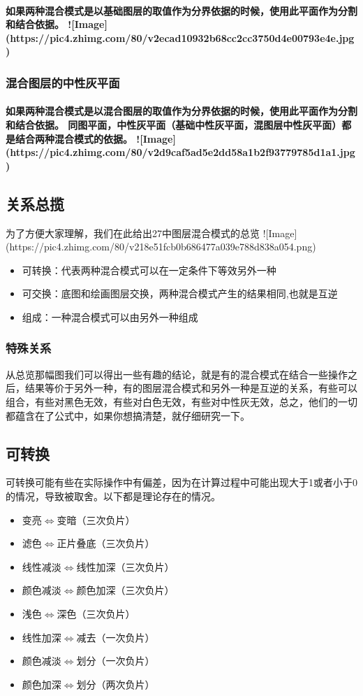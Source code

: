 \paragraph{如果两种混合模式是以基础图层的取值作为分界依据的时候，使用此平面作为分割和结合依据。
	![Image](https://pic4.zhimg.com/80/v2ecad10932b68cc2cc3750d4e00793e4e.jpg)}
\subsubsection{ 混合图层的中性灰平面}
\paragraph{如果两种混合模式是以混合图层的取值作为分界依据的时候，使用此平面作为分割和结合依据。
	同图平面，中性灰平面（基础中性灰平面，混图层中性灰平面）都是结合两种混合模式的依据。
	![Image](https://pic4.zhimg.com/80/v2d9caf5ad5e2dd58a1b2f93779785d1a1.jpg)}
\subsection{ 关系总揽}
为了方便大家理解，我们在此给出27中图层混合模式的总览
![Image](https://pic4.zhimg.com/80/v218e51fcb0b686477a039e788d838a054.png)
\begin{itemize}
	\item 可转换：代表两种混合模式可以在一定条件下等效另外一种
	\item 可交换：底图和绘画图层交换，两种混合模式产生的结果相同,也就是互逆
	\item 组成：一种混合模式可以由另外一种组成
\end{itemize}

\subsubsection{ 特殊关系}
从总览那幅图我们可以得出一些有趣的结论，就是有的混合模式在结合一些操作之后，结果等价于另外一种，有的图层混合模式和另外一种是互逆的关系，有些可以组合，有些对黑色无效，有些对白色无效，有些对中性灰无效，总之，他们的一切都蕴含在了公式中，如果你想搞清楚，就仔细研究一下。
\subsection{ 可转换}
可转换可能有些在实际操作中有偏差，因为在计算过程中可能出现大于1或者小于0的情况，导致被取舍。以下都是理论存在的情况。
\begin{itemize}
	\item 变亮$\Leftrightarrow$变暗（三次负片）
	\item 滤色$\Leftrightarrow$正片叠底（三次负片）
	\item 线性减淡$\Leftrightarrow$线性加深（三次负片）
	\item 颜色减淡$\Leftrightarrow$颜色加深（三次负片）
	\item 浅色$\Leftrightarrow$深色（三次负片）
	\item 线性加深$\Leftrightarrow$减去（一次负片）
	\item 颜色减淡$\Leftrightarrow$划分（一次负片）
	\item 颜色加深$\Leftrightarrow$划分（两次负片）
\end{itemize}

